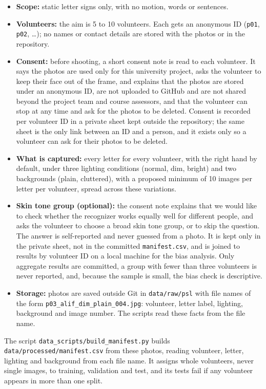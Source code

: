 \begin{itemize}
  \item \textbf{Scope:} static letter signs only, with no motion, words or sentences.
  \item \textbf{Volunteers:} the aim is 5 to 10 volunteers. Each gets an anonymous ID (\texttt{p01}, \texttt{p02}, \ldots); no names or contact details are stored with the photos or in the repository.
  \item \textbf{Consent:} before shooting, a short consent note is read to each volunteer. It says the photos are used only for this university project, asks the volunteer to keep their face out of the frame, and explains that the photos are stored under an anonymous ID, are not uploaded to GitHub and are not shared beyond the project team and course assessors, and that the volunteer can stop at any time and ask for the photos to be deleted. Consent is recorded per volunteer ID in a private sheet kept outside the repository; the same sheet is the only link between an ID and a person, and it exists only so a volunteer can ask for their photos to be deleted.
  \item \textbf{What is captured:} every letter for every volunteer, with the right hand by default, under three lighting conditions (normal, dim, bright) and two backgrounds (plain, cluttered), with a proposed minimum of 10 images per letter per volunteer, spread across these variations.
  \item \textbf{Skin tone group (optional):} the consent note explains that we would like to check whether the recognizer works equally well for different people, and asks the volunteer to choose a broad skin tone group, or to skip the question. The answer is self-reported and never guessed from a photo. It is kept only in the private sheet, not in the committed \texttt{manifest.csv}, and is joined to results by volunteer ID on a local machine for the bias analysis. Only aggregate results are committed, a group with fewer than three volunteers is never reported, and, because the sample is small, the bias check is descriptive.
  \item \textbf{Storage:} photos are saved outside Git in \texttt{data/raw/psl} with file names of the form \texttt{p03\_alif\_dim\_plain\_004.jpg}: volunteer, letter label, lighting, background and image number. The scripts read these facts from the file name.
\end{itemize}

The script \texttt{data\_scripts/build\_manifest.py} builds \texttt{data/processed/manifest.csv} from these photos, reading volunteer, letter, lighting and background from each file name. It assigns whole volunteers, never single images, to training, validation and test, and its tests fail if any volunteer appears in more than one split.

